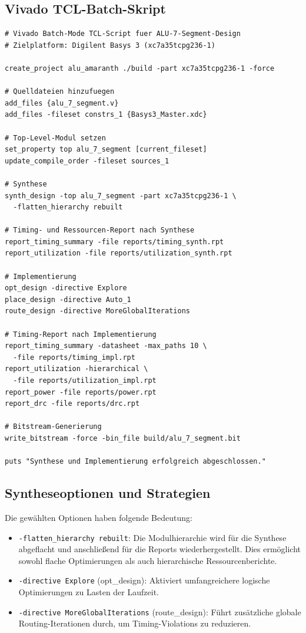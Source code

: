 ﻿\documentclass[12pt,a4paper]{report}
\begin{document}
\subsection{Vivado TCL-Batch-Skript}
\label{subsec:vivado_tcl}

\begin{lstlisting}[style=bashstyle, caption={Vollständiges Vivado Batch-Synthese-Skript}, label={lst:vivado_tcl}]
# Vivado Batch-Mode TCL-Script fuer ALU-7-Segment-Design
# Zielplatform: Digilent Basys 3 (xc7a35tcpg236-1)

create_project alu_amaranth ./build -part xc7a35tcpg236-1 -force

# Quelldateien hinzufuegen
add_files {alu_7_segment.v}
add_files -fileset constrs_1 {Basys3_Master.xdc}

# Top-Level-Modul setzen
set_property top alu_7_segment [current_fileset]
update_compile_order -fileset sources_1

# Synthese
synth_design -top alu_7_segment -part xc7a35tcpg236-1 \
  -flatten_hierarchy rebuilt

# Timing- und Ressourcen-Report nach Synthese
report_timing_summary -file reports/timing_synth.rpt
report_utilization -file reports/utilization_synth.rpt

# Implementierung
opt_design -directive Explore
place_design -directive Auto_1
route_design -directive MoreGlobalIterations

# Timing-Report nach Implementierung
report_timing_summary -datasheet -max_paths 10 \
  -file reports/timing_impl.rpt
report_utilization -hierarchical \
  -file reports/utilization_impl.rpt
report_power -file reports/power.rpt
report_drc -file reports/drc.rpt

# Bitstream-Generierung
write_bitstream -force -bin_file build/alu_7_segment.bit

puts "Synthese und Implementierung erfolgreich abgeschlossen."
\end{lstlisting}

\subsection{Syntheseoptionen und Strategien}
\label{subsec:synthese_optionen}

Die gewählten Optionen haben folgende Bedeutung:

\begin{itemize}
  \item \texttt{-flatten\_hierarchy rebuilt}: Die Modulhierarchie wird für die Synthese abgeflacht und anschließend für die Reports wiederhergestellt. Dies ermöglicht sowohl flache Optimierungen als auch hierarchische Ressourcenberichte.
  \item \texttt{-directive Explore} (opt\_design): Aktiviert umfangreichere logische Optimierungen zu Lasten der Laufzeit.
  \item \texttt{-directive MoreGlobalIterations} (route\_design): Führt zusätzliche globale Rou\-ting-Iterationen durch, um Timing-Violations zu reduzieren.
\end{itemize}
\end{document}
